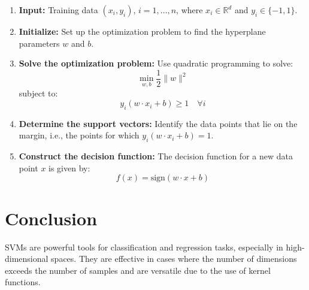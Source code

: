 \documentclass[12pt]{article}
\begin{document}
\begin{enumerate}
    \item \textbf{Input:} Training data $(x_i, y_i)$, $i = 1, \ldots, n$, where $x_i \in \mathbb{R}^d$ and $y_i \in \{-1, 1\}$.
    \item \textbf{Initialize:} Set up the optimization problem to find the hyperplane parameters $w$ and $b$.
    \item \textbf{Solve the optimization problem:} Use quadratic programming to solve:
    \[
    \min_{w, b} \frac{1}{2} \|w\|^2
    \]
    subject to:
    \[
    y_i (w \cdot x_i + b) \geq 1 \quad \forall i
    \]
    \item \textbf{Determine the support vectors:} Identify the data points that lie on the margin, i.e., the points for which $y_i (w \cdot x_i + b) = 1$.
    \item \textbf{Construct the decision function:} The decision function for a new data point $x$ is given by:
    \[
    f(x) = \text{sign}(w \cdot x + b)
    \]
\end{enumerate}

\section{Conclusion}
SVMs are powerful tools for classification and regression tasks, especially in high-dimensional spaces. They are effective in cases where the number of dimensions exceeds the number of samples and are versatile due to the use of kernel functions.
\end{document}
